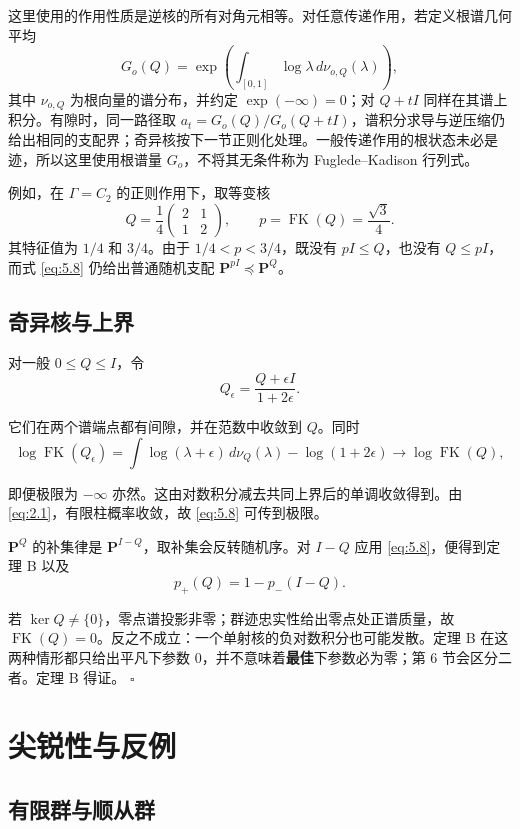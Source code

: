 \documentclass[UTF8,zihao=-4,a4paper]{ctexart}
\numberwithin{equation}{section}
\begin{document}
这里使用的作用性质是逆核的所有对角元相等。对任意传递作用，若定义根谱几何平均
\[
 G_o(Q)=\exp\left(\int_{[0,1]}\log\lambda\,d\nu_{o,Q}(\lambda)\right),
\]
其中 $\nu_{o,Q}$ 为根向量的谱分布，并约定 $\exp(-\infty)=0$；对 $Q+tI$ 同样在其谱上积分。有隙时，同一路径取 $a_t=G_o(Q)/G_o(Q+tI)$，谱积分求导与逆压缩仍给出相同的支配界；奇异核按下一节正则化处理。一般传递作用的根状态未必是迹，所以这里使用根谱量 $G_o$，不将其无条件称为 Fuglede--Kadison 行列式。

例如，在 \(\Gamma=C_2\) 的正则作用下，取等变核
\[
 Q=\frac14\begin{pmatrix}2&1\\1&2\end{pmatrix},
 \qquad p=\operatorname{FK}(Q)=\frac{\sqrt3}{4}.
\]
其特征值为 \(1/4\) 和 \(3/4\)。由于 \(1/4<p<3/4\)，既没有 \(pI\le Q\)，也没有 \(Q\le pI\)，而式 \eqref{eq:5.8} 仍给出普通随机支配 \(\mathbf P^{pI}\preceq\mathbf P^Q\)。

\subsection{奇异核与上界}

对一般 \(0\le Q\le I\)，令
\[
Q_\epsilon=\frac{Q+\epsilon I}{1+2\epsilon}.
\]

它们在两个谱端点都有间隙，并在范数中收敛到 \(Q\)。同时
\[
\log\operatorname{FK}(Q_\epsilon)
=\int\log(\lambda+\epsilon)\,d\nu_Q(\lambda)-\log(1+2\epsilon)
\longrightarrow\log\operatorname{FK}(Q),
\]

即便极限为 \(-\infty\) 亦然。这由对数积分减去共同上界后的单调收敛得到。由 \eqref{eq:2.1}，有限柱概率收敛，故 \eqref{eq:5.8} 可传到极限。

\(\mathbf P^Q\) 的补集律是 \(\mathbf P^{I-Q}\)，取补集会反转随机序。对 \(I-Q\) 应用 \eqref{eq:5.8}，便得到定理 B 以及
\[
p_+(Q)=1-p_-(I-Q).
\tag{5.9}\label{eq:5.9}
\]


若 \(\ker Q\ne\{0\}\)，零点谱投影非零；群迹忠实性给出零点处正谱质量，故
\(\operatorname{FK}(Q)=0\)。反之不成立：一个单射核的负对数积分也可能发散。定理 B 在这两种情形都只给出平凡下参数 \(0\)，并不意味着\textbf{最佳}下参数必为零；第 6 节会区分二者。定理 B 得证。 \(\square\)

\section{尖锐性与反例}

\subsection{有限群与顺从群}
\end{document}
